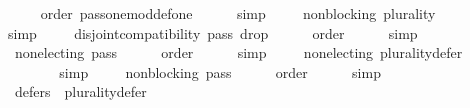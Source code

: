 \begin{isabellebody}
\ \ \ \ \isamarkupfalse%
\ order\ pass{\isacharunderscore}{\kern0pt}one{\isacharunderscore}{\kern0pt}mod{\isacharunderscore}{\kern0pt}def{\isacharunderscore}{\kern0pt}one\isanewline
\ \ \ \ \isamarkupfalse%
\ simp\isanewline
\ \ \isamarkupfalse%
\ {}{}{}{}{}{\isacharcolon}{\kern0pt}\ {\isachardoublequoteopen}non{\isacharunderscore}{\kern0pt}blocking\ {\isacharparenleft}{\kern0pt}plurality{\isasymdown}{\isacharparenright}{\kern0pt}{\isachardoublequoteclose}\isanewline
\ \ \ \ \isamarkupfalse%
\ simp\isanewline
\isanewline
\ \ \isamarkupfalse%
\ {}{}{}{}{\isacharcolon}{\kern0pt}\ {\isachardoublequoteopen}disjoint{\isacharunderscore}{\kern0pt}compatibility\ {\isacharquery}{\kern0pt}pass{}\ {\isacharquery}{\kern0pt}drop{}{\isachardoublequoteclose}\isanewline
\ \ \ \ \isamarkupfalse%
\ order\isanewline
\ \ \ \ \isamarkupfalse%
\ simp\ \isanewline
\ \ \isamarkupfalse%
\ {}{}{}{}{\isacharcolon}{\kern0pt}\ {\isachardoublequoteopen}non{\isacharunderscore}{\kern0pt}electing\ {\isacharquery}{\kern0pt}pass{}{\isachardoublequoteclose}\isanewline
\ \ \ \ \isamarkupfalse%
\ order\isanewline
\ \ \ \ \isamarkupfalse%
\ simp\isanewline
\ \ \isamarkupfalse%
\ {}{}{}{}{\isacharcolon}{\kern0pt}\ {\isachardoublequoteopen}non{\isacharunderscore}{\kern0pt}electing\ {\isacharquery}{\kern0pt}plurality{\isacharunderscore}{\kern0pt}defer{\isachardoublequoteclose}\isanewline
\ \ \ \ \isamarkupfalse%
\ {}{}{}{}{}\ {}{}{}{}{}\isanewline
\ \ \ \ \isamarkupfalse%
\ simp\isanewline
\ \ \isamarkupfalse%
\ {}{}{}{}{\isacharcolon}{\kern0pt}\ {\isachardoublequoteopen}non{\isacharunderscore}{\kern0pt}blocking\ {\isacharquery}{\kern0pt}pass{}{\isachardoublequoteclose}\isanewline
\ \ \ \ \isamarkupfalse%
\ order\isanewline
\ \ \ \ \isamarkupfalse%
\ simp\isanewline
\ \ \isamarkupfalse%
\ {}{}{}{}{\isacharcolon}{\kern0pt}\ {\isachardoublequoteopen}defers\ {}\ {\isacharquery}{\kern0pt}plurality{\isacharunderscore}{\kern0pt}defer{\isachardoublequoteclose}\isanewline

\end{isabellebody}
